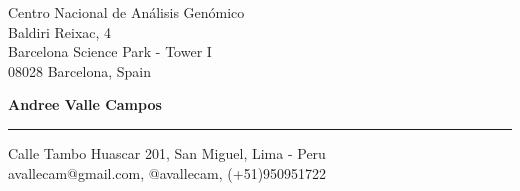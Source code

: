 \documentclass{letter} 					%
\begin{document}
\signature{Andree Valle Campos}         %
\longindentation=0pt                    %
\let\raggedleft\raggedright             %
 
 
\begin{letter}{
		Centro Nacional de An\'alisis Gen\'omico\\
		Baldiri Reixac, 4\\
		Barcelona Science Park - Tower I\\
		08028 Barcelona, Spain
		}


\begin{flushleft}
{\large\bf Andree Valle Campos}
\end{flushleft}
\medskip\hrule height 1pt
\begin{flushright}
\hfill Calle Tambo Huascar 201, San Miguel, Lima - Peru \\
\hfill avallecam@gmail.com, @avallecam, (+51)950951722
\end{flushright} 
\vfill %


\end{letter}
\end{document}
